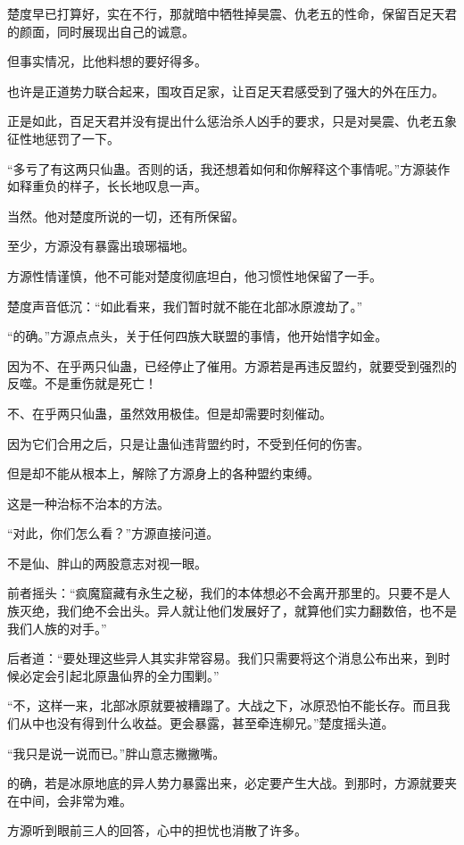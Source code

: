 \begin{this_body}
楚度早已打算好，实在不行，那就暗中牺牲掉昊震、仇老五的性命，保留百足天君的颜面，同时展现出自己的诚意。

但事实情况，比他料想的要好得多。

也许是正道势力联合起来，围攻百足家，让百足天君感受到了强大的外在压力。

正是如此，百足天君并没有提出什么惩治杀人凶手的要求，只是对昊震、仇老五象征性地惩罚了一下。

“多亏了有这两只仙蛊。否则的话，我还想着如何和你解释这个事情呢。”方源装作如释重负的样子，长长地叹息一声。

当然。他对楚度所说的一切，还有所保留。

至少，方源没有暴露出琅琊福地。

方源性情谨慎，他不可能对楚度彻底坦白，他习惯性地保留了一手。

楚度声音低沉：“如此看来，我们暂时就不能在北部冰原渡劫了。”

“的确。”方源点点头，关于任何四族大联盟的事情，他开始惜字如金。

因为不、在乎两只仙蛊，已经停止了催用。方源若是再违反盟约，就要受到强烈的反噬。不是重伤就是死亡！

不、在乎两只仙蛊，虽然效用极佳。但是却需要时刻催动。

因为它们合用之后，只是让蛊仙违背盟约时，不受到任何的伤害。

但是却不能从根本上，解除了方源身上的各种盟约束缚。

这是一种治标不治本的方法。

“对此，你们怎么看？”方源直接问道。

不是仙、胖山的两股意志对视一眼。

前者摇头：“疯魔窟藏有永生之秘，我们的本体想必不会离开那里的。只要不是人族灭绝，我们绝不会出头。异人就让他们发展好了，就算他们实力翻数倍，也不是我们人族的对手。”

后者道：“要处理这些异人其实非常容易。我们只需要将这个消息公布出来，到时候必定会引起北原蛊仙界的全力围剿。”

“不，这样一来，北部冰原就要被糟蹋了。大战之下，冰原恐怕不能长存。而且我们从中也没有得到什么收益。更会暴露，甚至牵连柳兄。”楚度摇头道。

“我只是说一说而已。”胖山意志撇撇嘴。

的确，若是冰原地底的异人势力暴露出来，必定要产生大战。到那时，方源就要夹在中间，会非常为难。

方源听到眼前三人的回答，心中的担忧也消散了许多。


\end{this_body}
